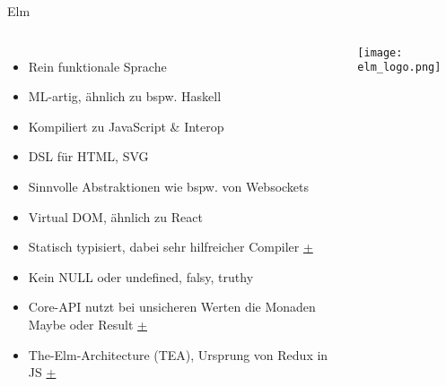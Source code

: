 \documentclass[compress]{beamer}
\begin{document}
\begin{frame}{Elm}
  \begin{columns}[c]
    \begin{itemize}
      \item Rein funktionale Sprache
      \item ML-artig, ähnlich zu bspw. Haskell
      \item Kompiliert zu JavaScript \& Interop
      \item DSL für HTML, SVG
      \item Sinnvolle Abstraktionen wie bspw. von Websockets
      \item Virtual DOM, ähnlich zu React
      \item Statisch typisiert, dabei sehr hilfreicher Compiler \href{http://elm-lang.org/blog/compiler-errors-for-humans}{\color{orange}+}
      \item Kein NULL oder undefined, falsy, truthy
      \item Core-API nutzt bei unsicheren Werten die Monaden Maybe oder Result \href{https://guide.elm-lang.org/error_handling/maybe.html}{\color{orange}+}
      \item The-Elm-Architecture (TEA), Ursprung von Redux in JS \href{https://guide.elm-lang.org/architecture/}{\color{orange}+}
    \end{itemize}
    \texttt{[image: elm\_logo.png]}
  \end{columns}
\end{frame}


\end{document}
